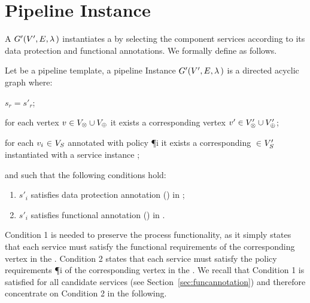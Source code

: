 \section{Pipeline Instance}\label{sec:instance}
A \pipelineInstance $G'(V',E,\lambda\,)$ instantiates a \pipelineTemplate \tChartFunction by selecting the component services according to its data protection and functional annotations. We formally define \tChartFunction as follows.

    \begin{definition}\label{def:instance}
      Let \tChartFunction be a pipeline template, a pipeline Instance $G'(V',E,\lambda\,)$ is a directed acyclic graph where:
      \begin{enumerate*}[label=\textit{\roman*})]
        \item $s_r$$=$$s'_r$;
        \item for each vertex $v_{}\in V_{\otimes}\cup V_{\oplus}$ it exists a corresponding vertex $v'_{}\in V'_{\otimes}\cup V'_{\oplus}$;
        \item for each $v_{i}$$\in$$V_S$ annotated with policy \P{i} it exists a corresponding $\in$$V'_S$ instantiated with a service instance ;
      \end{enumerate*}
      and such that the following conditions hold:
      \begin{enumerate}[label=\arabic*)]
        \item $s'_i$ satisfies data protection annotation \myLambda() in \tChartFunction;
        \item $s'_i$ satisfies functional annotation \myGamma() in \tChartFunction.
      \end{enumerate}
    \end{definition}

    Condition 1 is needed to preserve the process functionality, as it simply states that each service  must satisfy the functional requirements  of the corresponding vertex  in the \pipelineTemplate.
    Condition 2 states that each service  must satisfy the policy requirements \P{i} of the corresponding vertex  in the \pipelineTemplate.
    We recall that Condition 1 is satisfied for all candidate services (see Section~\ref{sec:funcannotation}) and therefore concentrate on Condition 2 in the following.

